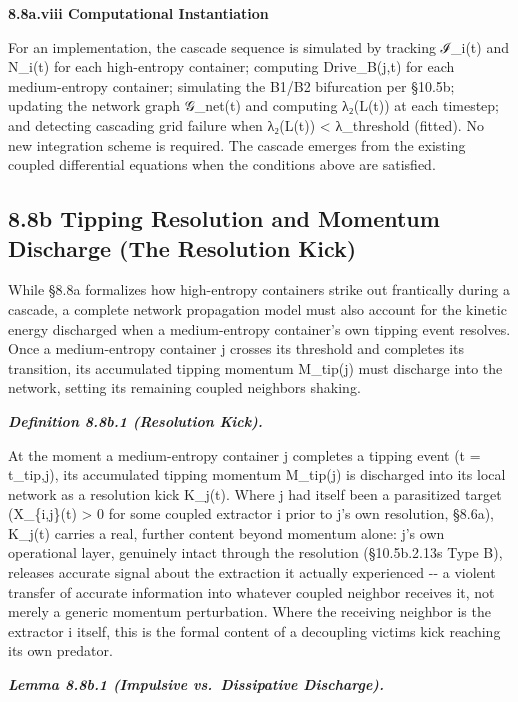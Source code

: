 \documentclass[
]{article}
\begin{document}
\textbf{8.8a.viii Computational Instantiation}

For an implementation, the cascade sequence is simulated by tracking
ℐ\_i(t) and N\_i(t) for each high-entropy container; computing
Drive\_B(j,t) for each medium-entropy container; simulating the B1/B2
bifurcation per §10.5b; updating the network graph 𝒢\_net(t) and
computing λ₂(L(t)) at each timestep; and detecting cascading grid
failure when λ₂(L(t)) \textless{} λ\_threshold (fitted). No new
integration scheme is required. The cascade emerges from the existing
coupled differential equations when the conditions above are satisfied.

\hypertarget{b-tipping-resolution-and-momentum-discharge-the-resolution-kick}{%
\subsection{8.8b Tipping Resolution and Momentum Discharge (The
Resolution
Kick)}\label{b-tipping-resolution-and-momentum-discharge-the-resolution-kick}}

While §8.8a formalizes how high-entropy containers strike out
frantically during a cascade, a complete network propagation model must
also account for the kinetic energy discharged when a medium-entropy
container's own tipping event resolves. Once a medium-entropy container
j crosses its threshold and completes its transition, its accumulated
tipping momentum M\_tip(j) must discharge into the network, setting its
remaining coupled neighbors shaking.

\emph{\textbf{Definition 8.8b.1 (Resolution Kick).}}

At the moment a medium-entropy container j completes a tipping event (t
= t\_tip,j), its accumulated tipping momentum M\_tip(j) is discharged
into its local network as a resolution kick K\_j(t). Where j had itself
been a parasitized target (X\_\{i,j\}(t) \textgreater{} 0 for some
coupled extractor i prior to j's own resolution, §8.6a), K\_j(t) carries
a real, further content beyond momentum alone: j's own operational layer,
genuinely intact through the resolution (§10.5b.2.13s Type B), releases
accurate signal about the extraction it actually experienced -\/- a
violent transfer of accurate information into whatever coupled neighbor
receives it, not merely a generic momentum perturbation. Where the
receiving neighbor is the extractor i itself, this is the formal content
of a decoupling victims kick reaching its own predator.

\emph{\textbf{Lemma 8.8b.1 (Impulsive vs.~Dissipative Discharge).}}
\end{document}
